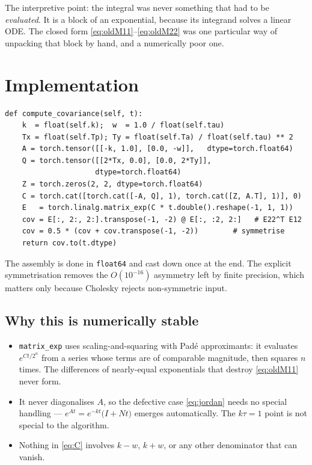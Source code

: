 \documentclass[11pt]{article}
\newcommand{\kk}{k}
\newcommand{\tauu}{\tau}
\begin{document}
The interpretive point: the integral was never something that had to be \emph{evaluated}.
It is a block of an exponential, because its integrand solves a linear ODE. The closed form
\eqref{eq:oldM11}--\eqref{eq:oldM22} was one particular way of unpacking that block by
hand, and a numerically poor one.

\section{Implementation}

\begin{verbatim}
def compute_covariance(self, t):
    k  = float(self.k);  w  = 1.0 / float(self.tau)
    Tx = float(self.Tp); Ty = float(self.Ta) / float(self.tau) ** 2
    A = torch.tensor([[-k, 1.0], [0.0, -w]],   dtype=torch.float64)
    Q = torch.tensor([[2*Tx, 0.0], [0.0, 2*Ty]],
                     dtype=torch.float64)
    Z = torch.zeros(2, 2, dtype=torch.float64)
    C = torch.cat([torch.cat([-A, Q], 1), torch.cat([Z, A.T], 1)], 0)
    E   = torch.linalg.matrix_exp(C * t.double().reshape(-1, 1, 1))
    cov = E[:, 2:, 2:].transpose(-1, -2) @ E[:, :2, 2:]   # E22^T E12
    cov = 0.5 * (cov + cov.transpose(-1, -2))        # symmetrise
    return cov.to(t.dtype)
\end{verbatim}

The assembly is done in \texttt{float64} and cast down once at the end. The explicit
symmetrisation removes the $O(10^{-16})$ asymmetry left by finite precision, which matters
only because Cholesky rejects non-symmetric input.

\subsection{Why this is numerically stable}

\begin{itemize}\itemsep3pt
\item \texttt{matrix\_exp} uses scaling-and-squaring with Pad\'e approximants: it evaluates
      $e^{Ct/2^{n}}$ from a series whose terms are of comparable magnitude, then squares
      $n$ times. The differences of nearly-equal exponentials that destroy
      \eqref{eq:oldM11} never form.
\item It never diagonalises $A$, so the defective case \eqref{eq:jordan} needs no special
      handling --- $e^{At}=e^{-\kk t}\big(I+Nt\big)$ emerges automatically. The
      $\kk\tauu=1$ point is not special to the algorithm.
\item Nothing in \eqref{eq:C} involves $\kk-w$, $\kk+w$, or any other denominator that can
      vanish.
\end{itemize}
\end{document}
